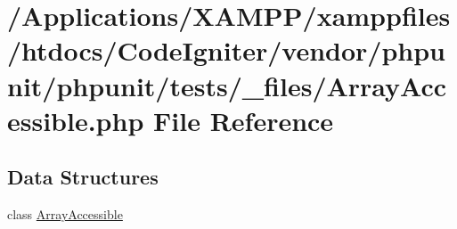 \hypertarget{_array_accessible_8php}{}\section{/\+Applications/\+X\+A\+M\+P\+P/xamppfiles/htdocs/\+Code\+Igniter/vendor/phpunit/phpunit/tests/\+\_\+files/\+Array\+Accessible.php File Reference}
\label{_array_accessible_8php}
\subsection*{Data Structures}
\begin{DoxyCompactItemize}
\item 
class \mbox{\hyperlink{class_array_accessible}{Array\+Accessible}}
\end{DoxyCompactItemize}
